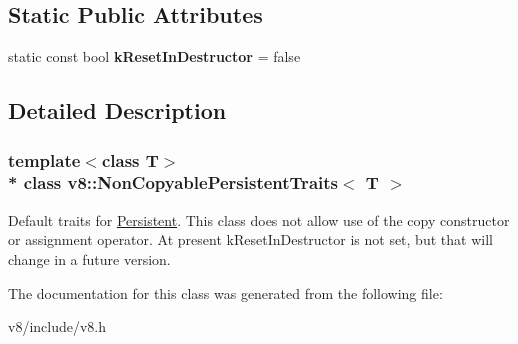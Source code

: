 \subsection*{Static Public Attributes}
\begin{DoxyCompactItemize}
\item 
static const bool {\bfseries k\+Reset\+In\+Destructor} = false\hypertarget{classv8_1_1NonCopyablePersistentTraits_a650880d85ff80634c30a195d20329681}{}\label{classv8_1_1NonCopyablePersistentTraits_a650880d85ff80634c30a195d20329681}

\end{DoxyCompactItemize}


\subsection{Detailed Description}
\subsubsection*{template$<$class T$>$\\*
class v8\+::\+Non\+Copyable\+Persistent\+Traits$<$ T $>$}

Default traits for \hyperlink{classv8_1_1Persistent}{Persistent}. This class does not allow use of the copy constructor or assignment operator. At present k\+Reset\+In\+Destructor is not set, but that will change in a future version. 

The documentation for this class was generated from the following file\+:\begin{DoxyCompactItemize}
\item 
v8/include/v8.\+h\end{DoxyCompactItemize}
